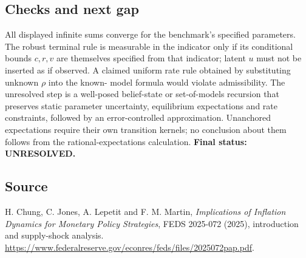 \documentclass[11pt]{article}
\begin{document}
\subsection*{Checks and next gap}
All displayed infinite sums converge for the benchmark's specified
parameters. The robust terminal rule is measurable in the indicator only
if its conditional bounds $c,r,v$ are themselves specified from that
indicator; latent $u$ must not be inserted as if observed. A claimed
uniform rate rule obtained by substituting unknown $\rho$ into the known-
model formula would violate admissibility. The unresolved step is a
well-posed belief-state or set-of-models recursion that preserves static
parameter uncertainty, equilibrium expectations and rate constraints,
followed by an error-controlled approximation. Unanchored expectations
require their own transition kernels; no conclusion about them follows
from the rational-expectations calculation.
\textbf{Final status: UNRESOLVED.}

\subsection*{Source}
H. Chung, C. Jones, A. Lepetit and F. M. Martin,
\emph{Implications of Inflation Dynamics for Monetary Policy Strategies},
FEDS 2025-072 (2025), introduction and supply-shock analysis.
\url{https://www.federalreserve.gov/econres/feds/files/2025072pap.pdf}.
\end{document}
